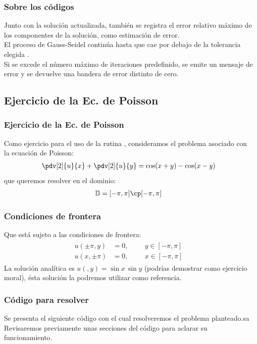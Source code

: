 \begin{frame}
\frametitle{Sobre los códigos}
Junto con la solución actualizada, también se registra el error relativo máximo de los componentes de la solución, como estimación de error.
\\
\bigskip
El proceso de Gauss-Seidel continúa hasta que  cae por debajo de la tolerancia elegida .
\\
\bigskip
Si se excede el número máximo de iteraciones predefinido, se emite un mensaje de error y se devuelve una bandera de error distinto de cero.
\end{frame}
\subsection{Ejercicio de la Ec. de Poisson}
\begin{frame}
\frametitle{Ejercicio de la Ec. de Poisson}
Como ejercicio para el uso de la rutina , consideramos el problema asociado con la ecuación de Poisson:
\begin{align}
\pdv[2]{u}{x} + \pdv[2]{u}{y} = \cos(x + y) - \cos (x - y)
\label{eq:ecuacion_13_30}
\end{align}
que queremos resolver en el dominio:
\begin{align*}
\mathbb{D} = [- \pi, \pi] \cp [-\pi, \pi]
\end{align*}
\end{frame}
\begin{frame}
\frametitle{Condiciones de frontera}
Que está sujeto a las condiciones de frontera:
\begin{align}
\begin{aligned}
u(\pm \pi, y) &= 0, \hspace{1cm} y \in [-\pi, \pi] \\[0.5em]
u(x, \pm \pi) &= 0, \hspace{1cm} x \in [-\pi, \pi]
\end{aligned}
\label{eq:ecuacion_13_31}
\end{align}
\pause
La solución analítica es $u(, y)=\sin x \, \sin y$ (podrías demostrar como ejercicio moral), ésta solución la podremos utilizar como referencia.
\end{frame}
\begin{frame}
\frametitle{Código para resolver}
Se presenta el siguiente código con el cual resolveremos el problema planteado.sa
\\
\bigskip
Revisaremos previamente unas secciones del código para aclarar su funcionamiento.
\end{frame}
